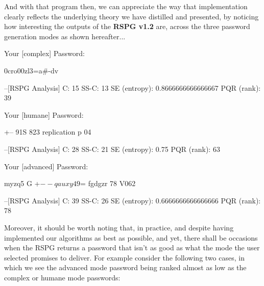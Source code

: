 \documentclass[a4paper, 18pt]{book} %
\begin{document}
{{{\vspace{2em}

And with that program then, we can appreciate the way that implementation clearly reflects the underlying theory we have distilled and presented, by noticing how interesting the outputs of the \textbf{RSPG v1.2} are, across the three password generation modes as shown hereafter...

\vspace{2em}

     \begin{tcbverbatim}[title=Sample OUTPUT 1 from RSPG v1.2]
Your [complex] Password: 

0cro00zl3=a#-dv

--[RSPG Analysis]
C: 15
SS-C: 13
SE (entropy): 0.8666666666666667
PQR (rank): 39%
  \end{tcbverbatim}


\vspace{2em}

    \begin{tcbverbatim}[title=Sample OUTPUT 2 from RSPG v1.2]
Your [humane] Password: 

+-- 91S 823 replication p 04

--[RSPG Analysis]
C: 28
SS-C: 21
SE (entropy): 0.75
PQR (rank): 63%
  \end{tcbverbatim}


\vspace{2em}


  \begin{tcbverbatim}[title=Sample OUTPUT 3 from RSPG v1.2]
Your [advanced] Password: 

myzq5 G +$-- qauxy 49 $= fgdgzr 78 V062

--[RSPG Analysis]
C: 39
SS-C: 26
SE (entropy): 0.6666666666666666
PQR (rank): 78%
  \end{tcbverbatim}


\vspace{2em}

Moreover, it should be worth noting that, in practice, and despite having implemented our algorithms as best as possible, and yet, there shall be occasions when the RSPG returns a password that isn't as good as what the mode the user selected promises to deliver. For example consider the following two cases, in which we see the advanced mode password being ranked almost as low as the complex or humane mode passwords:

\vspace{2em}
 \vspace{2em}

}}}
\end{document}
